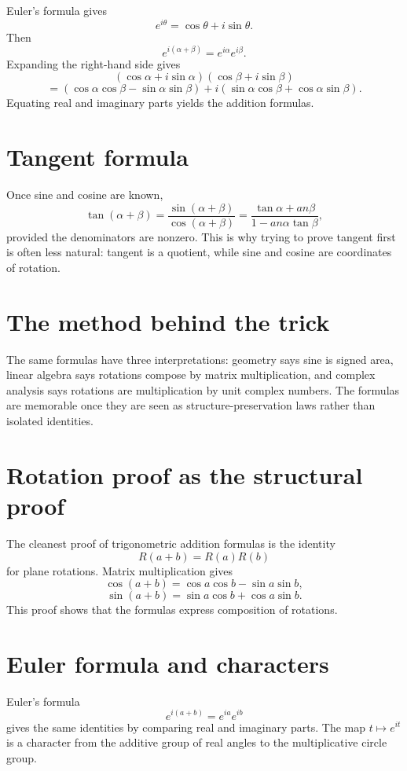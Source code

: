 Euler's formula gives
\[
  e^{i\theta}=\cos\theta+i\sin\theta.
\]
Then
\[
  e^{i(\alpha+\beta)}=e^{i\alpha}e^{i\beta}.
\]
Expanding the right-hand side gives
\[
  (\cos\alpha+i\sin\alpha)(\cos\beta+i\sin\beta)
\]
\[
  =(\cos\alpha\cos\beta-\sin\alpha\sin\beta)
  +i(\sin\alpha\cos\beta+\cos\alpha\sin\beta).
\]
Equating real and imaginary parts yields the addition formulas.

\section{Tangent formula}

Once sine and cosine are known,
\[
  \tan(\alpha+\beta)=\frac{\sin(\alpha+\beta)}{\cos(\alpha+\beta)}
  =\frac{\tan\alpha+	an\beta}{1-	an\alpha\tan\beta},
\]
provided the denominators are nonzero.  This is why trying to prove tangent first is often less natural: tangent is a quotient, while sine and cosine are coordinates of rotation.

\section{The method behind the trick}

The same formulas have three interpretations: geometry says sine is signed area, linear algebra says rotations compose by matrix multiplication, and complex analysis says rotations are multiplication by unit complex numbers.  The formulas are memorable once they are seen as structure-preservation laws rather than isolated identities.

\section{Rotation proof as the structural proof}

The cleanest proof of trigonometric addition formulas is the identity
\[
  R(a+b)=R(a)R(b)
\]
for plane rotations.  Matrix multiplication gives
\[
  \cos(a+b)=\cos a\cos b-\sin a\sin b,
\]
\[
  \sin(a+b)=\sin a\cos b+\cos a\sin b.
\]
This proof shows that the formulas express composition of rotations.

\section{Euler formula and characters}

Euler's formula
\[
  e^{i(a+b)}=e^{ia}e^{ib}
\]
gives the same identities by comparing real and imaginary parts.  The map \(t\mapsto e^{it}\) is a character from the additive group of real angles to the multiplicative circle group.

